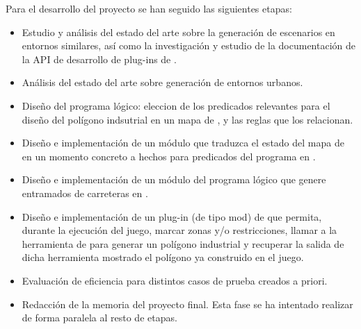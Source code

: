 Para el desarrollo del proyecto se han seguido las siguientes etapas:

\begin{itemize}
	\item Estudio y análisis del estado del arte sobre la generación de escenarios en entornos similares, así como la investigación y estudio de la documentación de la API de desarrollo de plug-ins de \cities. 
	\item Análisis del estado del arte sobre generación de entornos urbanos.
	\item Diseño del programa lógico: eleccion de los predicados relevantes para el diseño del polígono indsutrial en un mapa de \cities, y las reglas que los relacionan.
	\item Diseño e implementación de un módulo que traduzca el estado del mapa de \cities en un momento concreto a hechos para predicados del programa en \asp.
	\item Diseño e implementación de un módulo del programa lógico que genere entramados de carreteras en \asp.
	\item Diseño e implementación de un plug-in (de tipo mod) de \cities que permita, durante la ejecución del juego, marcar zonas y/o restricciones, llamar a la herramienta de \asp para generar un polígono industrial y recuperar la salida de dicha herramienta mostrado el polígono ya construido en el juego.
	\item Evaluación de eficiencia para distintos casos de prueba creados a priori.
	\item Redacción de la memoria del proyecto final. Esta fase se ha intentado realizar de forma paralela al resto de etapas.
\end{itemize}